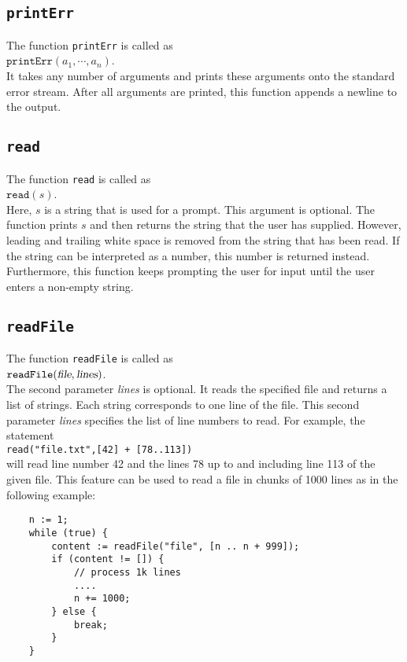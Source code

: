 \subsection{\texttt{printErr}}
The function \texttt{printErr}  is called as
\\[0.2cm]
\hspace*{1.3cm}
$\mathtt{printErr}(a_1, \cdots, a_n)$.
\\[0.2cm]
It takes any number of arguments and prints these arguments onto the standard error
stream.  After all arguments are
printed, this function appends a newline to the output.

\subsection{\texttt{read}}
The function \texttt{read}  is called as
\\[0.2cm]
\hspace*{1.3cm}
$\mathtt{read}(s)$.
\\[0.2cm]
Here, $s$ is a string that is used for a prompt.  This argument is optional. The function
prints $s$ and then 
returns the string that the user has supplied.  However, leading and trailing white space 
is removed from the string that has been read.  If the string can be interpreted as a
number, this number is returned instead.  Furthermore, this function keeps prompting the
user for input until the user enters a non-empty string.

\subsection{\texttt{readFile}}
The function \texttt{readFile}  is called as
\\[0.2cm]
\hspace*{1.3cm}
$\mathtt{readFile}(\textsl{file}, \textsl{lines})$.
\\[0.2cm]
The second parameter \textsl{lines} is optional.
It reads the specified file and returns a list of strings.  Each string corresponds to one
line of the file.   This second parameter \textsl{lines} specifies the list of line
numbers to read.  For example,  the statement 
\\[0.2cm]
\hspace*{1.3cm}
\texttt{read("file.txt",[42] + [78..113])}
\\[0.2cm]
will read line number 42 and the lines 78 up to and including line 113 of the given file.
This feature can be used to read a file in chunks of 1000 lines as in the following example:
\begin{verbatim}
    n := 1;
    while (true) {
        content := readFile("file", [n .. n + 999]);
        if (content != []) {
            // process 1k lines
            ....
            n += 1000;
        } else {
            break;
        }
    }
\end{verbatim}


